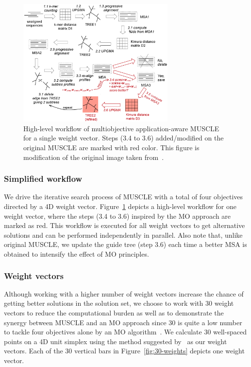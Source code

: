 \begin{figure}[!htbp]
	\centering
	\includegraphics[width=0.7\textwidth]{Figure/ma-muscle}
	\caption{High-level workflow of multiobjective application-aware MUSCLE for a single weight vector. Steps (3.4 to 3.6) added/modified on the original MUSCLE are marked with red color. This figure is modification of the original image taken from~\cite{edgar2004muscle}.}
	\label{fig:ma-muscle}
\end{figure}

\subsubsection{Simplified workflow}
We drive the iterative search process of MUSCLE with a total of four objectives directed by a 4D weight vector. Figure~\ref{fig:ma-muscle} depicts a high-level workflow for one weight vector, where the steps (3.4 to 3.6) inspired by the MO approach are marked as red. This workflow is executed for all weight vectors to get alternative solutions and can be performed independently in parallel. %
Also note that, unlike original MUSCLE, we update the guide tree (step 3.6) each time a better MSA is obtained to intensify the effect of MO principles.

\subsubsection{Weight vectors}
Although working with a higher number of weight vectors increase the chance of getting better solutions in the solution set, we choose to work with 30 weight vectors to reduce the computational burden as well as to demonstrate the synergy between MUSCLE and an MO approach since 30 is quite a low number to tackle four objectives alone by an MO algorithm~\cite{deb2014evolutionary}. We calculate 30 well-spaced points on a 4D unit simplex using the method suggested by~\cite{ref_dirs_energy} as our weight vectors. Each of the 30 vertical bars in Figure~\ref{fig:30-weights} depicts one weight vector. %


